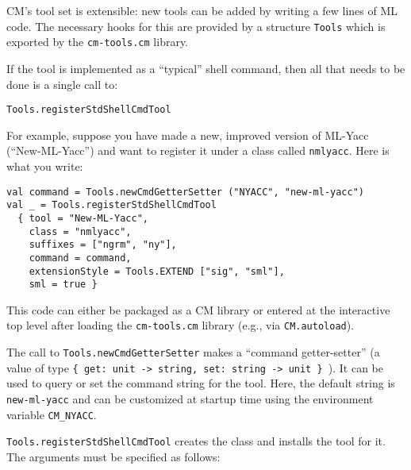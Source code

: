 \documentclass{article}
\begin{document}
CM's tool set is extensible: new tools can be added by writing a few
lines of ML code.  The necessary hooks for this are provided by a
structure {\tt Tools} which is exported by the {\tt cm-tools.cm}
library.

If the tool is implemented as a ``typical'' shell command, then all
that needs to be done is a single call to:

\begin{verbatim}
Tools.registerStdShellCmdTool
\end{verbatim}

For example, suppose you have made a
new, improved version of ML-Yacc (``New-ML-Yacc'') and want to
register it under a class called {\tt nmlyacc}.  Here is what you
write:

\begin{verbatim}
val command = Tools.newCmdGetterSetter ("NYACC", "new-ml-yacc")
val _ = Tools.registerStdShellCmdTool
  { tool = "New-ML-Yacc",
    class = "nmlyacc",
    suffixes = ["ngrm", "ny"],
    command = command,
    extensionStyle = Tools.EXTEND ["sig", "sml"],
    sml = true }
\end{verbatim}

This code can either be packaged as a CM library or entered at the
interactive top level after loading the {\tt cm-tools.cm} library
(e.g., via {\tt CM.autoload}).

The call to {\tt Tools.newCmdGetterSetter} makes a ``command
getter-setter'' (a value of type {\tt \{ get: unit -> string,
set: string -> unit \} }). It can be used to query or set the
command string for the tool.  Here, the default string is {\tt
new-ml-yacc} and can be customized at startup time using the
environment variable {\tt CM\_NYACC}.

{\tt Tools.registerStdShellCmdTool} creates the class and installs the
tool for it.  The arguments must be specified as follows:
\end{document}
